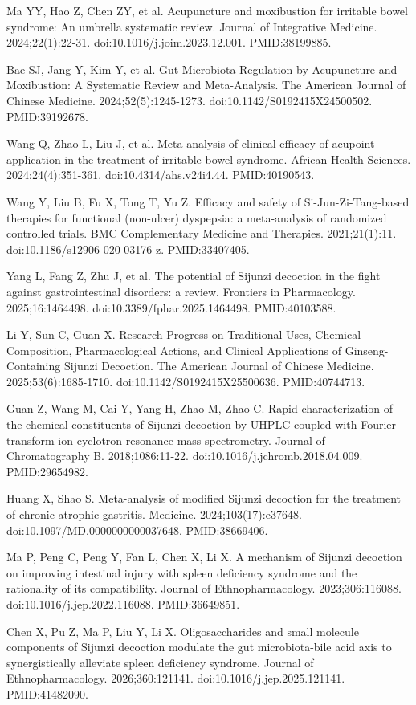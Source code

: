 \documentclass[11pt,oneside]{book}
\newcommand{\reff}[2]{\par\hangindent=7mm\hangafter=1\noindent[#1]\hspace{2mm}#2\par}
\begin{document}
\reff{44}{Ma YY, Hao Z, Chen ZY, et al. Acupuncture and moxibustion for irritable bowel syndrome: An umbrella systematic review. Journal of Integrative Medicine. 2024;22(1):22-31. doi:10.1016/j.joim.2023.12.001. PMID:38199885.}
\reff{45}{Bae SJ, Jang Y, Kim Y, et al. Gut Microbiota Regulation by Acupuncture and Moxibustion: A Systematic Review and Meta-Analysis. The American Journal of Chinese Medicine. 2024;52(5):1245-1273. doi:10.1142/S0192415X24500502. PMID:39192678.}
\reff{46}{Wang Q, Zhao L, Liu J, et al. Meta analysis of clinical efficacy of acupoint application in the treatment of irritable bowel syndrome. African Health Sciences. 2024;24(4):351-361. doi:10.4314/ahs.v24i4.44. PMID:40190543.}
\reff{47}{Wang Y, Liu B, Fu X, Tong T, Yu Z. Efficacy and safety of Si-Jun-Zi-Tang-based therapies for functional (non-ulcer) dyspepsia: a meta-analysis of randomized controlled trials. BMC Complementary Medicine and Therapies. 2021;21(1):11. doi:10.1186/s12906-020-03176-z. PMID:33407405.}
\reff{48}{Yang L, Fang Z, Zhu J, et al. The potential of Sijunzi decoction in the fight against gastrointestinal disorders: a review. Frontiers in Pharmacology. 2025;16:1464498. doi:10.3389/fphar.2025.1464498. PMID:40103588.}
\reff{49}{Li Y, Sun C, Guan X. Research Progress on Traditional Uses, Chemical Composition, Pharmacological Actions, and Clinical Applications of Ginseng-Containing Sijunzi Decoction. The American Journal of Chinese Medicine. 2025;53(6):1685-1710. doi:10.1142/S0192415X25500636. PMID:40744713.}
\reff{50}{Guan Z, Wang M, Cai Y, Yang H, Zhao M, Zhao C. Rapid characterization of the chemical constituents of Sijunzi decoction by UHPLC coupled with Fourier transform ion cyclotron resonance mass spectrometry. Journal of Chromatography B. 2018;1086:11-22. doi:10.1016/j.jchromb.2018.04.009. PMID:29654982.}
\reff{51}{Huang X, Shao S. Meta-analysis of modified Sijunzi decoction for the treatment of chronic atrophic gastritis. Medicine. 2024;103(17):e37648. doi:10.1097/MD.0000000000037648. PMID:38669406.}
\reff{52}{Ma P, Peng C, Peng Y, Fan L, Chen X, Li X. A mechanism of Sijunzi decoction on improving intestinal injury with spleen deficiency syndrome and the rationality of its compatibility. Journal of Ethnopharmacology. 2023;306:116088. doi:10.1016/j.jep.2022.116088. PMID:36649851.}
\reff{53}{Chen X, Pu Z, Ma P, Liu Y, Li X. Oligosaccharides and small molecule components of Sijunzi decoction modulate the gut microbiota-bile acid axis to synergistically alleviate spleen deficiency syndrome. Journal of Ethnopharmacology. 2026;360:121141. doi:10.1016/j.jep.2025.121141. PMID:41482090.}
\end{document}
